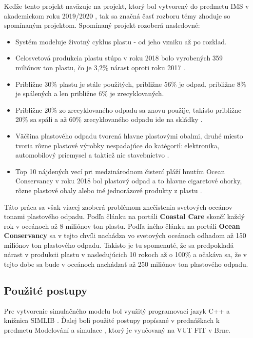 \documentclass[a4paper, 11pt]{article}
\begin{document}
Keďže tento projekt naväzuje na projekt, ktorý bol vytvorený do predmetu IMS v akademickom roku 2019/2020 \cite{IMS_project}, tak sa značná časť rozboru témy zhoduje so spomínaným projektom. Spomínaný projekt rozoberá nasledovné:

\begin{itemize}
	\item Systém modeluje životný cyklus plastu - od jeho vzniku až po rozklad.
	\item Celosvetová produkcia plastu stúpa v roku 2018 bolo vyrobených 359 miliónov ton plastu, čo je 3,2\% nárast oproti roku 2017 \cite{plastic_Europe}.
	\item Približne 30\% plastu je stále použitých, približne 56\% je odpad, približne 8\% je spálených a len približne 6\% je zrecyklovaných.
	\item Približne 20\% zo zrecyklovaného odpadu sa znovu použije, takisto približne 20\% sa spáli a až 60\% zrecyklovaného odpadu ide na skládky \cite{plastic_pollution_stats} \cite{plastic_sciencemag}.
	\item Väčšina plastového odpadu tvorená hlavne plastovými obalmi, druhé miesto tvoria rôzne plastové výrobky nespadajúce do katégorií: elektronika,
	      automobilový priemysel a taktiež nie stavebníctvo \cite{plastic_graph}.
	\item Top 10 nájdených vecí pri medzinárodnom čistení pláží hnutím Ocean Conservancy v roku 2018 bol plastový odpad a to hlavne cigaretové ohorky, rôzne plastové obaly	alebo iné jednorázové produkty z plastu \cite{beach_cleanup}.
\end{itemize}

Táto práca sa však viacej zaoberá problémom znečistenia svetových oceánov tonami plastového odpadu. Podľa článku na portáli \textbf{Coastal Care} \cite{plastic_pollution} skončí každý rok v oceánoch až 8 miliónov ton plastu. Podľa iného článku na portáli \textbf{Ocean Conservancy} \cite{ocean_conservancy} sa v tejto chvíli nachádza vo svetových oceánoch odhadom až 150 miliónov ton plastového odpadu. Takisto je tu spomenuté, že sa predpokladá nárast v produkcii plastu v nasledujúcich 10 rokoch až o 100\% a očakáva sa, že v tejto dobe sa bude v oceánoch nachádzať až 250 miliónov ton plastového odpadu.

\subsection{Použité postupy}

Pre vytvorenie simulačného modelu bol využitý programovací jazyk C++ a knižnica SIMLIB \cite{SIMLIB}. Ďalej boli použité postupy popísané v prednáškach k predmetu Modelování a simulace \cite{IMS_slides}, ktorý je vyučovaný na VUT FIT v Brne.
\end{document}
